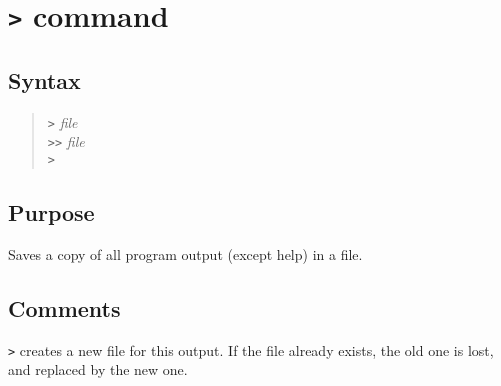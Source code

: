 %
%
%
%
\section{{\tt >} command}
\subsection{Syntax}
\begin{verse}
{\tt >} {\it file}\\
{\tt >>} {\it file}\\
{\tt >}
\end{verse}
\subsection{Purpose}

Saves a copy of all program output (except help) in a file.
\subsection{Comments}

{\tt >} creates a new file for this output.  If the file already exists, the
old one is lost, and replaced by the new one.

